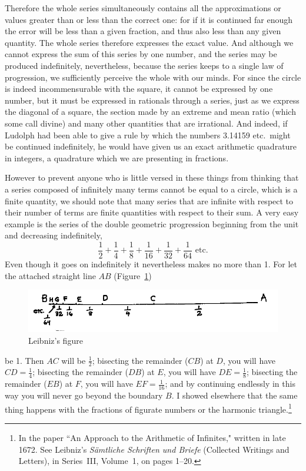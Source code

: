 \documentclass[twoside,openright]{article}
\begin{document}
\vspace*{1ex}

\noindent Therefore the whole series simultaneously contains all the
approximations or values greater than or less than the correct one:
for if it is continued far enough the error will be less than a given
fraction, and thus also less than any given quantity.  The whole
series therefore expresses the exact value.  And although we cannot
express the sum of this series by one number, and the series may be
produced indefinitely, nevertheless, because the series keeps to a
single law of progression, we sufficiently perceive the whole with our
minds. For since the circle is indeed incommensurable with the square,
it cannot be expressed by one number, but it must be expressed in
rationals through a series, just as we express the diagonal of a
square, the section made by an extreme and mean ratio (which some call
divine) and many other quantities that are irrational.  And indeed, if
Ludolph had been able to give a rule by which the numbers 3.14159
etc.\ might be continued indefinitely, he would have given us an exact
arithmetic quadrature in integers, a quadrature which we are
presenting in fractions.

However to prevent anyone who is little versed in these things from
thinking that a series composed of infinitely many terms cannot be
equal to a circle, which is a finite quantity, we should note that
many series that are infinite with respect to their number of terms
are finite quantities with respect to their sum.  A very easy example
is the series of the double geometric progression beginning from the
unit and decreasing indefinitely,
$$\frac{1}{2}
+ \frac{1}{4} +\frac{1}{8} + \frac{1}{16} + \frac{1}{32} +
\frac{1}{64}\mbox{ etc.}$$ Even though it goes on indefinitely it
nevertheless makes no more than 1.  For let the attached straight line
$AB$ (Figure~\ref{linesum})
\begin{figure}[htp]
  \begin{center}
    \includegraphics[width=\textwidth]{fig/Figure62}
    \vspace{-20pt}
    \caption{Leibniz's figure}
    \label{linesum}
  \end{center}
\end{figure} be 1.  Then $AC$ will be $\frac{1}{2}$; bisecting the
remainder ($CB$) at $D$, you will have $CD = \frac{1}{4}$; bisecting
the remainder ($DB$) at $E$, you will have $DE = \frac{1}{8}$;
bisecting the remainder ($EB$) at $F$, you will have
$EF = \frac{1}{16}$; and by continuing endlessly in this way you will
never go beyond the boundary $B$.  I showed elsewhere that the same
thing happens with the fractions of figurate numbers or the harmonic
triangle.\footnote{In the paper ``An Approach to the Arithmetic of
  Infinites," written in late 1672.  See Leibniz's {\em S\"{a}mtliche
    Schriften und Briefe} (Collected Writings and Letters), in
  Series~III, Volume~1, on pages 1--20.}
\end{document}
